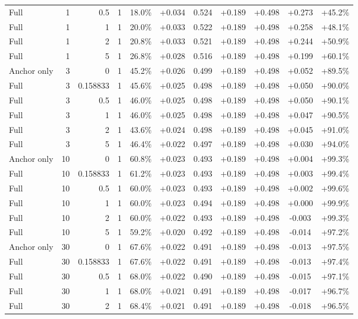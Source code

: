 \begin{table}[htbp]
\begin{tabular}{lrrrccccccc}
Full & 1 & 0.5 & 1 & 18.0\% & +0.034 & 0.524 & +0.189 & +0.498 & +0.273 & +45.2\% \\
Full & 1 & 1 & 1 & 20.0\% & +0.033 & 0.522 & +0.189 & +0.498 & +0.258 & +48.1\% \\
Full & 1 & 2 & 1 & 20.8\% & +0.033 & 0.521 & +0.189 & +0.498 & +0.244 & +50.9\% \\
Full & 1 & 5 & 1 & 26.8\% & +0.028 & 0.516 & +0.189 & +0.498 & +0.199 & +60.1\% \\
Anchor only & 3 & 0 & 1 & 45.2\% & +0.026 & 0.499 & +0.189 & +0.498 & +0.052 & +89.5\% \\
Full & 3 & 0.158833 & 1 & 45.6\% & +0.025 & 0.498 & +0.189 & +0.498 & +0.050 & +90.0\% \\
Full & 3 & 0.5 & 1 & 46.0\% & +0.025 & 0.498 & +0.189 & +0.498 & +0.050 & +90.1\% \\
Full & 3 & 1 & 1 & 46.0\% & +0.025 & 0.498 & +0.189 & +0.498 & +0.047 & +90.5\% \\
Full & 3 & 2 & 1 & 43.6\% & +0.024 & 0.498 & +0.189 & +0.498 & +0.045 & +91.0\% \\
Full & 3 & 5 & 1 & 46.4\% & +0.022 & 0.497 & +0.189 & +0.498 & +0.030 & +94.0\% \\
Anchor only & 10 & 0 & 1 & 60.8\% & +0.023 & 0.493 & +0.189 & +0.498 & +0.004 & +99.3\% \\
Full & 10 & 0.158833 & 1 & 61.2\% & +0.023 & 0.493 & +0.189 & +0.498 & +0.003 & +99.4\% \\
Full & 10 & 0.5 & 1 & 60.0\% & +0.023 & 0.493 & +0.189 & +0.498 & +0.002 & +99.6\% \\
Full & 10 & 1 & 1 & 60.0\% & +0.023 & 0.494 & +0.189 & +0.498 & +0.000 & +99.9\% \\
Full & 10 & 2 & 1 & 60.0\% & +0.022 & 0.493 & +0.189 & +0.498 & -0.003 & +99.3\% \\
Full & 10 & 5 & 1 & 59.2\% & +0.020 & 0.492 & +0.189 & +0.498 & -0.014 & +97.2\% \\
Anchor only & 30 & 0 & 1 & 67.6\% & +0.022 & 0.491 & +0.189 & +0.498 & -0.013 & +97.5\% \\
Full & 30 & 0.158833 & 1 & 67.6\% & +0.022 & 0.491 & +0.189 & +0.498 & -0.013 & +97.4\% \\
Full & 30 & 0.5 & 1 & 68.0\% & +0.022 & 0.490 & +0.189 & +0.498 & -0.015 & +97.1\% \\
Full & 30 & 1 & 1 & 68.0\% & +0.021 & 0.491 & +0.189 & +0.498 & -0.017 & +96.7\% \\
Full & 30 & 2 & 1 & 68.4\% & +0.021 & 0.491 & +0.189 & +0.498 & -0.018 & +96.5\% \\

\end{tabular}
\end{table}
